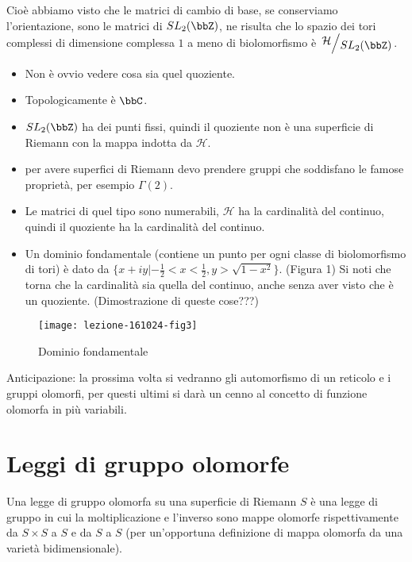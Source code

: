 Cioè abbiamo visto che le matrici di cambio di base, se conserviamo l'orientazione, sono le matrici di $SL_2(\bbZ)$, ne risulta che lo spazio dei tori complessi di dimensione complessa $1$ a meno di biolomorfismo è $\quotient{\mathcal{H}}{SL_2(\bbZ)}$.

\begin{osservazione}
\begin{itemize}
\item Non è ovvio vedere cosa sia quel quoziente.
\item Topologicamente è $\bbC$.
\item $SL_2(\bbZ)$ ha dei punti fissi, quindi il quoziente non è una superficie di Riemann con la mappa indotta da $\mathcal{H}$.
\item per avere superfici di Riemann devo prendere gruppi che soddisfano le famose proprietà, per esempio $\Gamma (2)$.
\item Le matrici di quel tipo sono numerabili, $\mathcal H$ ha la cardinalità del continuo, quindi il quoziente ha la cardinalità del continuo.
\item Un dominio fondamentale (contiene un punto per ogni classe di biolomorfismo di tori) è dato da $\{ x+iy | -\frac{1}{2}<x<\frac{1}{2}, y>\sqrt{1-x^2}\}$. (Figura 1)
Si noti che torna che la cardinalità sia quella del continuo, anche senza aver visto che è un quoziente. (Dimostrazione di queste cose???)
\end{itemize}
\end{osservazione}

\begin{figure}[h]
\texttt{[image: lezione-161024-fig3]}
\caption{Dominio fondamentale}\label{fig:2}
\end{figure}

Anticipazione: la prossima volta si vedranno gli automorfismo di un reticolo e i gruppi olomorfi, per questi ultimi si darà un cenno al concetto di funzione olomorfa in più variabili.

\chapter{Leggi di gruppo olomorfe}

\begin{definizione}
Una legge di gruppo olomorfa su una superficie di Riemann $S$ è una legge di gruppo in cui la moltiplicazione e l'inverso sono mappe olomorfe rispettivamente da $S \times S$ a $S$ e da $S$ a $S$ (per un'opportuna definizione di mappa olomorfa da una varietà bidimensionale).
\end{definizione}

